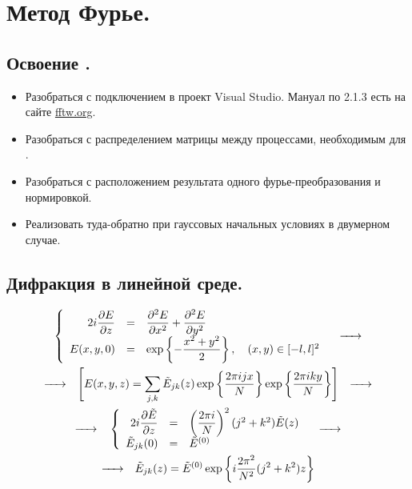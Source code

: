 \section{Метод Фурье.}


\subsection{Освоение \fftw.}

\begin{itemize}
	\item Разобраться с подключением {\fftw} в проект Visual Studio. Мануал по {\fftw} 2.1.3 есть на сайте \href{http://fftw.org}{fftw.org}.
	\item Разобраться с распределением матрицы между процессами, необходимым для \fftw.
	\item Разобраться с расположением результата одного фурье-преобразования и нормировкой.
	\item Реализовать  туда-обратно при гауссовых начальных условиях в двумерном случае.
\end{itemize}


\subsection{Дифракция в линейной среде.}
\begin{multline*}
	\left\{
	\begin{array}{rcl}
		2i\dfrac{\partial E}{\partial{z}}&=&\dfrac{\partial^2 E}{\partial{x^2}}+
		\dfrac{\partial^2 E}{\partial{y^2}}\\
		E(x,y,0)&=&\exp\left\{-\dfrac{x^2+y^2}{2}\right\},\quad (x,y)\in[-l,l]^2
	\end{array}
	\right.
	\quad{\hbox to 0.7cm{\rightarrowfill}}\\
	{\hbox to 0.7cm{\rightarrowfill}}\quad
	\Biggl[
	E(x,y,z)=\sum\limits_{j,k}\tilde{E}_{jk}(z)\exp\left\{\dfrac{2\pi ijx}{N}\right\}
	\exp\left\{\dfrac{2\pi iky}{N}\right\}
	\Biggr]
	\quad{\hbox to 0.7cm{\rightarrowfill}}\\
	{\hbox to 0.7cm{\rightarrowfill}}\quad
	\left\{
	\begin{array}{rcl}
		2i\dfrac{\partial\tilde E}{\partial{z}}&=&\left(\dfrac{2\pi i}{N}\right)^2(j^2+k^2)
		\tilde E(z)\\
		\tilde E_{jk}(0)&=&\tilde E^{(0)}
	\end{array}
	\right.
	\quad{\hbox to 0.7cm{\rightarrowfill}}\\
	{\hbox to 0.7cm{\rightarrowfill}}\quad
	\tilde E_{jk}(z)=\tilde E^{(0)}\exp\left\{i\dfrac{2\pi^2}{N^2}(j^2+k^2)z\right\}
\end{multline*}

